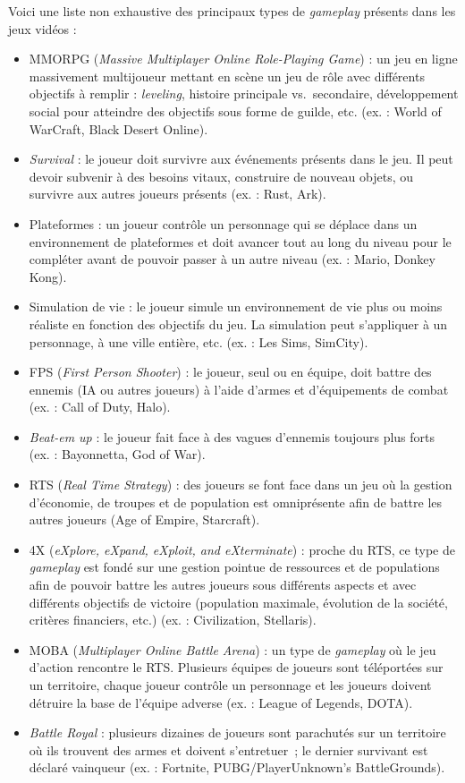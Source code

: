 Voici une liste non exhaustive des principaux types de \emph{gameplay} présents dans les jeux vidéos :
\begin{itemize}
    \item MMORPG (\emph{Massive Multiplayer Online Role-Playing Game}) : un jeu en ligne massivement multijoueur mettant en scène un jeu de rôle avec différents objectifs à remplir : \emph{leveling}, histoire principale vs.\ secondaire, développement social pour atteindre des objectifs sous forme de guilde, etc. (ex. : World of WarCraft, Black Desert Online).
    \item \emph{Survival} : le joueur doit survivre aux événements présents dans le jeu. Il peut devoir subvenir à des besoins vitaux, construire de nouveau objets, ou survivre aux autres joueurs présents (ex. : Rust, Ark).
    \item Plateformes : un joueur contrôle un personnage qui se déplace dans un environnement de plateformes et doit avancer tout au long du niveau pour le compl\'eter avant de pouvoir passer à un autre niveau (ex. : Mario, Donkey Kong).
    \item Simulation de vie : le joueur simule un environnement de vie plus ou moins réaliste en fonction des objectifs du jeu. La simulation peut s'appliquer à un personnage, à une ville entière, etc. (ex. : Les Sims, SimCity).
    \item FPS (\emph{First Person Shooter}) : le joueur, seul ou en équipe, doit battre des ennemis (IA ou autres joueurs) à l'aide d'armes et d'équipements de combat (ex. : Call of Duty, Halo).
    \item \emph{Beat-em up} : le joueur fait face à des vagues d'ennemis toujours plus forts (ex. : Bayonnetta, God of War).
    \item RTS (\emph{Real Time Strategy}) : des joueurs se font face dans un jeu o\`u la gestion d'économie, de troupes et de population est omniprésente afin de battre les autres joueurs (Age of Empire, Starcraft).
    \item 4X (\emph{eXplore, eXpand, eXploit, and eXterminate}) : proche du RTS, ce type de \emph{gameplay} est fondé sur une gestion pointue de ressources et de populations afin de pouvoir battre les autres joueurs sous différents aspects et avec différents objectifs de victoire (population maximale, évolution de la société, critères financiers, etc.) (ex. : Civilization, Stellaris).
    \item MOBA (\emph{Multiplayer Online Battle Arena}) : un type de \emph{gameplay} o\`u le jeu d'action rencontre le RTS. Plusieurs équipes de joueurs sont téléportées sur un territoire, chaque joueur contrôle un personnage et les joueurs doivent détruire la base de l'équipe adverse (ex. : League of Legends, DOTA).
    \item \emph{Battle Royal} : plusieurs dizaines de joueurs sont parachutés sur un territoire o\`u ils trouvent des armes et doivent s'entretuer~; le dernier survivant est déclaré vainqueur (ex. : Fortnite, PUBG/PlayerUnknown's BattleGrounds).
\end{itemize}

